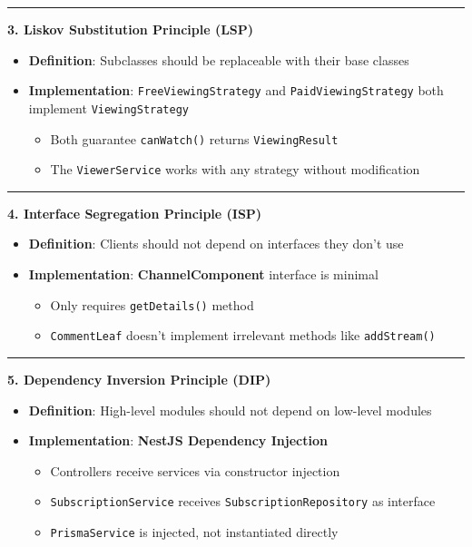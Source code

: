 \documentclass[10pt]{article}
\begin{document}
\begin{tcolorbox}[
  colback=white,
  colframe=dark,
  arc=3pt,
  boxrule=1pt,
  before skip=8pt,
  after skip=8pt
]
\hrule

\textbf{3. Liskov Substitution Principle (LSP)}
\begin{itemize}
\item \textbf{Definition}: Subclasses should be replaceable with their base classes
\item \textbf{Implementation}: \texttt{FreeViewingStrategy} and \texttt{PaidViewingStrategy} both implement \texttt{ViewingStrategy}
\begin{itemize}
\item Both guarantee \texttt{canWatch()} returns \texttt{ViewingResult}
\item The \texttt{ViewerService} works with any strategy without modification
\end{itemize}
\end{itemize}

\hrule

\textbf{4. Interface Segregation Principle (ISP)}
\begin{itemize}
\item \textbf{Definition}: Clients should not depend on interfaces they don't use
\item \textbf{Implementation}: \textbf{ChannelComponent} interface is minimal
\begin{itemize}
\item Only requires \texttt{getDetails()} method
\item \texttt{CommentLeaf} doesn't implement irrelevant methods like \texttt{addStream()}
\end{itemize}
\end{itemize}

\hrule

\textbf{5. Dependency Inversion Principle (DIP)}
\begin{itemize}
\item \textbf{Definition}: High-level modules should not depend on low-level modules
\item \textbf{Implementation}: \textbf{NestJS Dependency Injection}
\begin{itemize}
\item Controllers receive services via constructor injection
\item \texttt{SubscriptionService} receives \texttt{SubscriptionRepository} as interface
\item \texttt{PrismaService} is injected, not instantiated directly
\end{itemize}
\end{itemize}

\end{tcolorbox}
\end{document}
